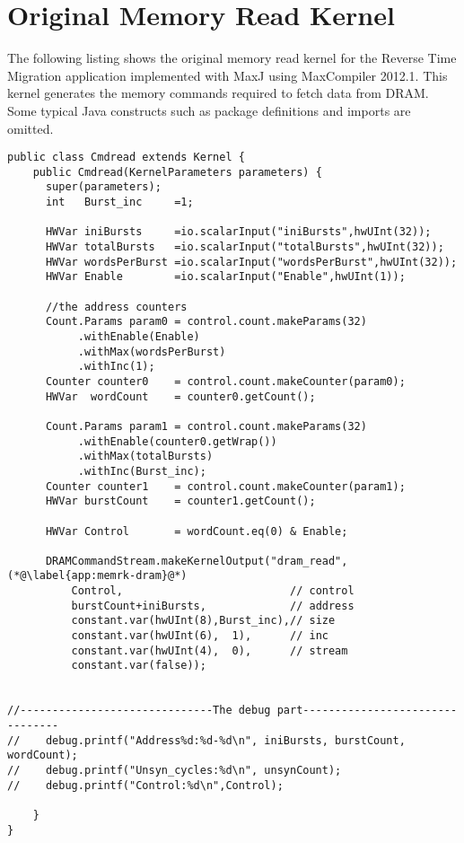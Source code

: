 \chapter{Original Memory Read Kernel}
\label{app:mem-read-kernel}
The following listing shows the original memory read kernel for the
Reverse Time Migration application implemented with MaxJ using
MaxCompiler 2012.1. This kernel generates the memory commands required
to fetch data from DRAM. Some typical Java constructs such as package
definitions and imports are omitted.
\begin{lstlisting}
public class Cmdread extends Kernel {
    public Cmdread(KernelParameters parameters) {
      super(parameters);
      int   Burst_inc     =1;

      HWVar iniBursts     =io.scalarInput("iniBursts",hwUInt(32));
      HWVar totalBursts   =io.scalarInput("totalBursts",hwUInt(32));
      HWVar wordsPerBurst =io.scalarInput("wordsPerBurst",hwUInt(32));
      HWVar Enable        =io.scalarInput("Enable",hwUInt(1));

      //the address counters
      Count.Params param0 = control.count.makeParams(32)
           .withEnable(Enable)
           .withMax(wordsPerBurst)
           .withInc(1);
      Counter counter0    = control.count.makeCounter(param0);
      HWVar  wordCount    = counter0.getCount();

      Count.Params param1 = control.count.makeParams(32)
           .withEnable(counter0.getWrap())
           .withMax(totalBursts)
           .withInc(Burst_inc);
      Counter counter1    = control.count.makeCounter(param1);
      HWVar burstCount    = counter1.getCount();

      HWVar Control       = wordCount.eq(0) & Enable;

      DRAMCommandStream.makeKernelOutput("dram_read", (*@\label{app:memrk-dram}@*)
          Control,                          // control
          burstCount+iniBursts,             // address
          constant.var(hwUInt(8),Burst_inc),// size
          constant.var(hwUInt(6),  1),      // inc
          constant.var(hwUInt(4),  0),      // stream
          constant.var(false));


//------------------------------The debug part--------------------------------
//    debug.printf("Address%d:%d-%d\n", iniBursts, burstCount, wordCount);
//    debug.printf("Unsyn_cycles:%d\n", unsynCount);
//    debug.printf("Control:%d\n",Control);

    }
}
\end{lstlisting}